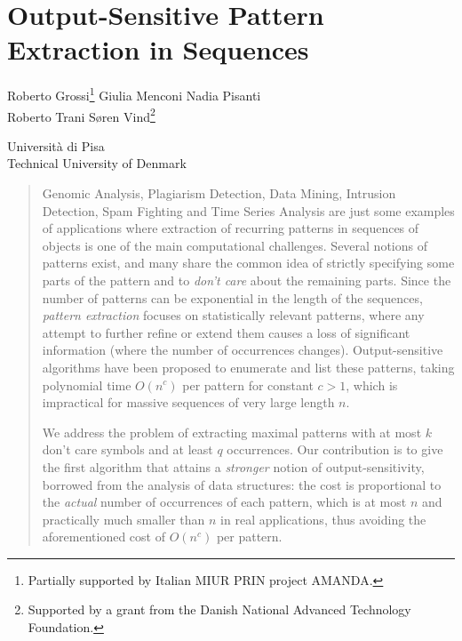 \chapter{Output-Sensitive Pattern Extraction in Sequences}\label{chp:patternextraction}

\begin{infosection}
    \begin{authors}
        Roberto Grossi\footnote{Partially supported by Italian MIUR PRIN project AMANDA.} \qquad Giulia Menconi \qquad Nadia Pisanti \\  
        Roberto Trani \qquad S{\o}ren Vind\footnote{Supported by a grant from the Danish National Advanced Technology Foundation.}
    \end{authors}

    \begin{uninames}
         Universit\`{a} di Pisa \\
         Technical University of Denmark
    \end{uninames}

    \begin{abstract}
        Genomic Analysis, Plagiarism Detection, Data Mining, Intrusion Detection, Spam Fighting and Time Series Analysis are just some examples of applications where extraction of recurring patterns in sequences of objects is one of the main computational challenges.
        Several notions of patterns exist, and many share the common idea of strictly specifying some parts of the pattern and to \emph{don't care} about the remaining parts. Since the number of patterns can be exponential in the length of the sequences, \emph{pattern extraction} focuses on statistically relevant patterns, where any attempt to further refine or extend them causes a loss of significant information (where the number of occurrences changes).
    Output-sensitive algorithms have been proposed to enumerate and list these patterns, taking polynomial time $O(n^c)$ per pattern for constant $c >1$, which is impractical for massive sequences of very large length $n$.

        We address the problem of extracting maximal patterns with at most $k$ don't care symbols and at least $q$ occurrences. Our contribution is to give the first algorithm that attains a \emph{stronger} notion of output-sensitivity, borrowed from the analysis of data structures: the cost is proportional to the \emph{actual} number of occurrences of each pattern, which is at most $n$ and practically much smaller than $n$ in real applications, thus avoiding the aforementioned cost of $O(n^c)$ per pattern.
    \end{abstract}
\end{infosection}


